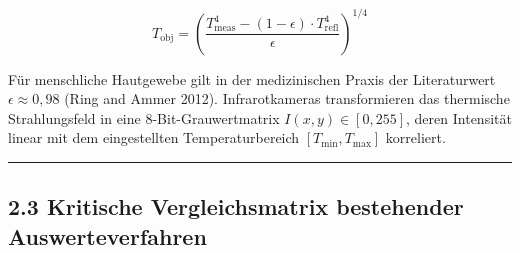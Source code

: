 \documentclass[
  11pt,
]{article}
\begin{document}
\[ T_{\text{obj}} = \left( \frac{T_{\text{meas}}^4 - (1 - \epsilon) \cdot T_{\text{refl}}^4}{\epsilon} \right)^{1/4} \]

Für menschliche Hautgewebe gilt in der medizinischen Praxis der
Literaturwert \(\epsilon \approx 0{,}98\) (Ring and Ammer 2012).
Infrarotkameras transformieren das thermische Strahlungsfeld in eine
8-Bit-Grauwertmatrix \(I(x,y) \in [0, 255]\), deren Intensität linear
mit dem eingestellten Temperaturbereich \([T_{\min}, T_{\max}]\)
korreliert.

\begin{center}\rule{0.5\linewidth}{0.5pt}\end{center}

\subsection{2.3 Kritische Vergleichsmatrix bestehender
Auswerteverfahren}\label{kritische-vergleichsmatrix-bestehender-auswerteverfahren}
\end{document}
